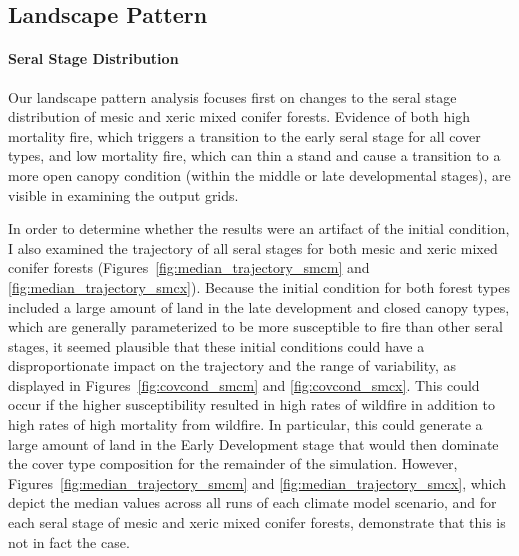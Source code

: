 \subsection*{Landscape Pattern}

\paragraph{Seral Stage Distribution}
Our landscape pattern analysis focuses first on changes to the seral stage distribution of mesic and xeric mixed conifer forests. Evidence of both high mortality fire, which triggers a transition to the early seral stage for all cover types, and low mortality fire, which can thin a stand and cause a transition to a more open canopy condition (within the middle or late developmental stages), are visible in examining the output grids.

In order to determine whether the results were an artifact of the initial condition, I also examined the trajectory of all seral stages for both mesic and xeric mixed conifer forests (Figures~\ref{fig:median_trajectory_smcm} and \ref{fig:median_trajectory_smcx}). Because the initial condition for both forest types included a large amount of land in the late development and closed canopy types, which are generally parameterized to be more susceptible to fire than other seral stages, it seemed plausible that these initial conditions could have a disproportionate impact on the trajectory and the range of variability, as displayed in Figures~\ref{fig:covcond_smcm} and \ref{fig:covcond_smcx}. This could occur if the higher susceptibility resulted in high rates of wildfire in addition to high rates of high mortality from wildfire. In particular, this could generate a large amount of land in the Early Development stage that would then dominate the cover type composition for the remainder of the simulation. However, Figures~\ref{fig:median_trajectory_smcm} and \ref{fig:median_trajectory_smcx}, which depict the median values across all runs of each climate model scenario, and for each seral stage of mesic and xeric mixed conifer forests, demonstrate that this is not in fact the case. 

